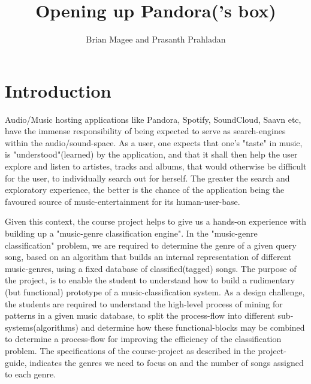 \documentclass[10pt]{article}
\begin{document}
                                       
\title{Opening up Pandora('s box)}
\author{Brian Magee and Prasanth Prahladan}
\maketitle

\section{Introduction}

Audio/Music hosting applications like Pandora, Spotify, SoundCloud, Saavn etc, have the immense responsibility of being expected to serve as search-engines within the audio/sound-space. As a user, one expects that one's "taste" in music, is "understood"(learned) by the application, and that it shall then help the user explore and listen to artistes, tracks and albums, that would otherwise be difficult for the user, to individually search out for herself. The greater the search and exploratory experience, the better is the chance of the application being the favoured source of music-entertainment for its human-user-base.

Given this context, the course project helps to give us a hands-on experience with building up a "music-genre classification engine". In the "music-genre classification" problem, we are required to determine the genre of a given query song, based on an algorithm that builds an internal representation of different music-genres, using a fixed database of classified(tagged) songs. The purpose of the project, is to enable the student to understand how to build a rudimentary (but functional) prototype of a music-classification system. As a design challenge, the students are required to understand the high-level process of mining for patterns in a given music database, to split the process-flow into different sub-systems(algorithms) and determine how these functional-blocks may be combined to determine a process-flow for improving the efficiency of the classification problem. The specifications of the course-project as described in the project-guide, indicates the genres we need to focus on and the number of songs assigned to each genre. 
\end{document}
